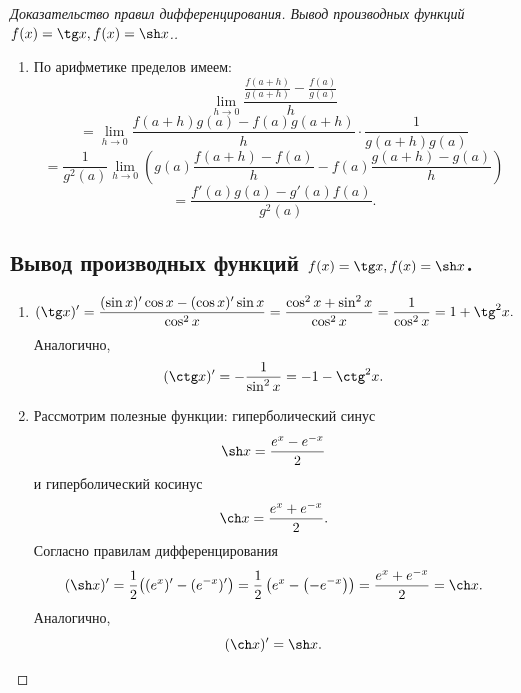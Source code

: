 \begin{proof}[Доказательство правил дифференцирования. Вывод производных функций $f(x) = \tg x, f(x) = \sh x$.]
\begin{note}[amber]
\begin{note}[purple]
\begin{enumerate}[label=\arabic*)]
\[            \right)
            \]
            \[
            = g(a)f'(a)+g'(a)f(a).
            \]
            \item 
            По арифметике пределов имеем:
            \[
            \lim_{h\to 0}\frac{\frac{f(a+h)}{g(a+h)}-\frac{f(a)}{g(a)}}{h}
            \]
            \[
            =\lim_{h\to 0}
            \frac{f(a+h)g(a)-f(a)g(a+h)}{h}\cdot\frac{1}{g(a+h)g(a)}
            \]
            \[
            =\frac{1}{g^2(a)}\lim_{h\to 0}
            \left(
            g(a)\frac{f(a+h)-f(a)}{h}
            -
            f(a)\frac{g(a+h)-g(a)}{h}
            \right)
            \]
            \[
            =\frac{f'(a)g(a)-g'(a)f(a)}{g^2(a)}.
            \]
            \end{enumerate}
        \end{note}
    \end{note}

    \subsection*{Вывод производных функций $f(x) = \tg x, f(x) = \sh x$.}
    \begin{note}[amber]
        \begin{note}[purple]
            \begin{enumerate}[label=\arabic*)]
            \item
            \[
            (\tg x)'=\frac{(\sin x)'\cos x-(\cos x)'\sin x}{\cos^2 x}
            =\frac{\cos^2 x+\sin^2 x}{\cos^2 x}
            =\frac{1}{\cos^2 x}
            =1+\tg^2 x.
            \]
            Аналогично,
            \[
            (\ctg x)'=-\frac{1}{\sin^2 x}=-1-\ctg^2 x.
            \]
            \item 
            Рассмотрим полезные функции: гиперболический синус 
            \[
            \sh x=\frac{e^x-e^{-x}}{2}
            \]
            и гиперболический косинус
            \[
            \ch x=\frac{e^x+e^{-x}}{2}.
            \]
            Согласно правилам дифференцирования
            \[
            (\sh x)'=\frac{1}{2}\big((e^x)'-(e^{-x})'\big)
            =\frac{1}{2}\left(e^x-\left(-e^{-x}\right)\right)
            =\frac{e^x+e^{-x}}{2}
            =\ch x.
            \]
            Аналогично,
            \[
            (\ch x)'=\sh x.
            \]
            \end{enumerate}
        \end{note}
    \end{note}
\end{proof}
